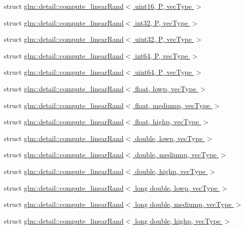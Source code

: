 \begin{DoxyCompactItemize}
\item 
struct \hyperlink{structglm_1_1detail_1_1compute__linear_rand_3_01uint16_00_01_p_00_01vec_type_01_4}{glm\-::detail\-::compute\-\_\-linear\-Rand$<$ uint16, P, vec\-Type $>$}
\item 
struct \hyperlink{structglm_1_1detail_1_1compute__linear_rand_3_01int32_00_01_p_00_01vec_type_01_4}{glm\-::detail\-::compute\-\_\-linear\-Rand$<$ int32, P, vec\-Type $>$}
\item 
struct \hyperlink{structglm_1_1detail_1_1compute__linear_rand_3_01uint32_00_01_p_00_01vec_type_01_4}{glm\-::detail\-::compute\-\_\-linear\-Rand$<$ uint32, P, vec\-Type $>$}
\item 
struct \hyperlink{structglm_1_1detail_1_1compute__linear_rand_3_01int64_00_01_p_00_01vec_type_01_4}{glm\-::detail\-::compute\-\_\-linear\-Rand$<$ int64, P, vec\-Type $>$}
\item 
struct \hyperlink{structglm_1_1detail_1_1compute__linear_rand_3_01uint64_00_01_p_00_01vec_type_01_4}{glm\-::detail\-::compute\-\_\-linear\-Rand$<$ uint64, P, vec\-Type $>$}
\item 
struct \hyperlink{structglm_1_1detail_1_1compute__linear_rand_3_01float_00_01lowp_00_01vec_type_01_4}{glm\-::detail\-::compute\-\_\-linear\-Rand$<$ float, lowp, vec\-Type $>$}
\item 
struct \hyperlink{structglm_1_1detail_1_1compute__linear_rand_3_01float_00_01mediump_00_01vec_type_01_4}{glm\-::detail\-::compute\-\_\-linear\-Rand$<$ float, mediump, vec\-Type $>$}
\item 
struct \hyperlink{structglm_1_1detail_1_1compute__linear_rand_3_01float_00_01highp_00_01vec_type_01_4}{glm\-::detail\-::compute\-\_\-linear\-Rand$<$ float, highp, vec\-Type $>$}
\item 
struct \hyperlink{structglm_1_1detail_1_1compute__linear_rand_3_01double_00_01lowp_00_01vec_type_01_4}{glm\-::detail\-::compute\-\_\-linear\-Rand$<$ double, lowp, vec\-Type $>$}
\item 
struct \hyperlink{structglm_1_1detail_1_1compute__linear_rand_3_01double_00_01mediump_00_01vec_type_01_4}{glm\-::detail\-::compute\-\_\-linear\-Rand$<$ double, mediump, vec\-Type $>$}
\item 
struct \hyperlink{structglm_1_1detail_1_1compute__linear_rand_3_01double_00_01highp_00_01vec_type_01_4}{glm\-::detail\-::compute\-\_\-linear\-Rand$<$ double, highp, vec\-Type $>$}
\item 
struct \hyperlink{structglm_1_1detail_1_1compute__linear_rand_3_01long_01double_00_01lowp_00_01vec_type_01_4}{glm\-::detail\-::compute\-\_\-linear\-Rand$<$ long double, lowp, vec\-Type $>$}
\item 
struct \hyperlink{structglm_1_1detail_1_1compute__linear_rand_3_01long_01double_00_01mediump_00_01vec_type_01_4}{glm\-::detail\-::compute\-\_\-linear\-Rand$<$ long double, mediump, vec\-Type $>$}
\item 
struct \hyperlink{structglm_1_1detail_1_1compute__linear_rand_3_01long_01double_00_01highp_00_01vec_type_01_4}{glm\-::detail\-::compute\-\_\-linear\-Rand$<$ long double, highp, vec\-Type $>$}
\end{DoxyCompactItemize}
